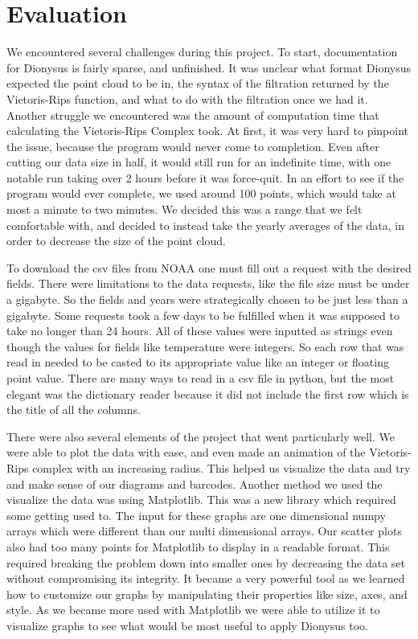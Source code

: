 \documentclass[12pt]{report}
\begin{document}
\section*{Evaluation}
We encountered several challenges during this project. To start, documentation for Dionysus is fairly sparse, and unfinished. It was unclear what format Dionysus expected the point cloud to be in, the syntax of the filtration returned by the Vietoris-Rips function, and what to do with the filtration once we had it. Another struggle we encountered was the amount of computation time that calculating the Vietoris-Rips Complex took. At first, it was very hard to pinpoint the issue, because the program would never come to completion. Even after cutting our data size in half, it would still run for an indefinite time, with one notable run taking over 2 hours before it was force-quit. In an effort to see if the program would ever complete, we used around 100 points, which would take at most a minute to two minutes. We decided this was a range that we felt comfortable with, and decided to instead take the yearly averages of the data, in order to decrease the size of the point cloud.\par 
To download the csv files from NOAA one must fill out a request with the desired fields. There were limitations to the data requests, like the file size must be under a gigabyte. So the fields and years were strategically chosen to be just less than a gigabyte. Some requests took a few days to be fulfilled when it was supposed to take no longer than 24 hours. All of these values were inputted as strings even though the values for fields like temperature were integers. So each row that was read in needed to be casted to its appropriate value like an integer or floating point value. There are many ways to read in a csv file in python, but the most elegant was the dictionary reader because it did not include the first row which is the title of all the columns.\par
There were also several elements of the project that went particularly well. We were able to plot the data with ease, and even made an animation of the Vietoris-Rips complex with an increasing radius. This helped us visualize the data and try and make sense of our diagrams and barcodes. Another method we used the visualize the data was using Matplotlib. This was a new library which required some getting used to. The input for these graphs are one dimensional numpy arrays which were different than our multi dimensional arrays. Our scatter plots also had too many points for Matplotlib to display in a readable format. This required breaking the problem down into smaller ones by decreasing the data set without compromising its integrity. It became a very powerful tool as we learned how to customize our graphs by manipulating their properties like size, axes, and style. As we became more used with Matplotlib we were able to utilize it to visualize graphs to see what would be most useful to apply Dionysus too. \par
\end{document}
